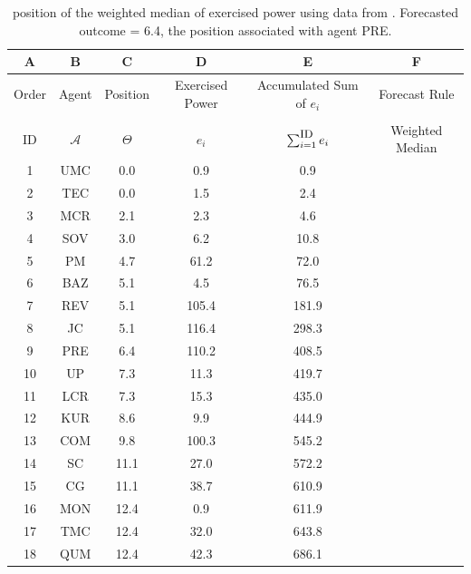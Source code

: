 \newpage
%

\begin{table}[h]
\centering
\begin{tabular}{cccccc}
\hline
A & B & C & D & E & F\\ \hline
Order & Agent &	 Position %
& Exercised Power  & Accumulated Sum of $e_i$
&  Forecast Rule
\\ 
\hline \\ [-8pt]
ID & \multicolumn{1}{c}{$\mathcal{A}$} & \multicolumn{1}{c}{$\Theta$} & \multicolumn{1}{c}{$e_i$} &
$\sum_{i=1}^{\mbox{\small ID}} e_i$
  & Weighted Median \\ [3pt]
\hline\hline
1 & UMC & 	0.0	& 0.9	 & 0.9 & \\
2 & TEC	& 0.0	& 1.5  & 2.4 & \\
3 & MCR	 & 2.1 & 2.3	 & 4.6 &  \\
4 & SOV	& 3.0 & 6.2  & 10.8 &  \\
5 & PM & 4.7 & 	61.2	 & 72.0 &  \\
6 & BAZ	& 5.1  &	4.5  & 76.5  & 	\\
7 & REV	& 5.1	 & 105.4  & 181.9 &	 \\
8 & JC	& 5.1 & 	116.4 & 298.3	&  \\
9 & PRE &	6.4	& 110.2	 & 408.5 & \ding{52} \\
10 & UP	& 7.3 & 	11.3	 & 419.7 &  \\
11 & LCR	& 7.3	 &  15.3	 & 435.0 & \\
12 & KUR &	8.6	& 9.9  & 444.9 &  \\
13 & COM	 & 9.8 &	100.3	 & 545.2 &  \\
14 & SC &	11.1	& 27.0	 & 572.2 &  \\  %
15 & CG	& 11.1 &	38.7  & 610.9 & 	 \\
16 & MON	 & 12.4 &	0.9	 & 611.9 &  \\
17 & TMC	 & 12.4	& 32.0  & 643.8 &	 \\
18 & QUM	 & 12.4 &	42.3  & 686.1 & 	 \\
\hline
\end{tabular}
\caption{  {position} of the weighted median of   {exercised power} using data from \cite[Tables 1 and 2]{mesquita_1984}. Forecasted outcome =  6.4, the   {position} associated with agent PRE.}
\label{table:mesquita_data_1984_weighted_median_exercised_power}
\end{table}

